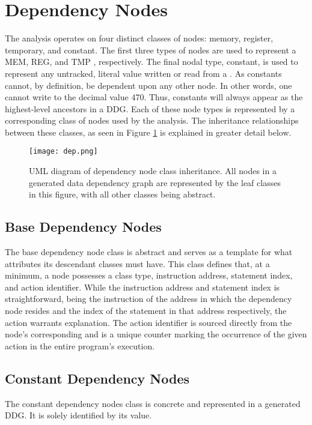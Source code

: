 \section{Dependency Nodes}
The analysis operates on four distinct classes of nodes: memory, register, temporary, and constant. The first three types of nodes are used to represent a MEM, REG, and TMP , respectively. The final nodal type, constant, is used to represent any untracked, literal value written or read from a . As constants cannot, by definition, be dependent upon any other node. In other words, one cannot write to the decimal value 470. Thus, constants will always appear as the highest-level ancestors in a DDG. Each of these node types is represented by a corresponding class of nodes used by the analysis. The inheritance relationships between these classes, as seen in Figure \ref{fig:dep} is explained in greater detail below.

\begin{figure}
    \centering
    \texttt{[image: dep.png]}
    \caption[UML Diagram of Dependency Node Class Inheritance]{UML diagram of dependency node class inheritance. All nodes in a generated data dependency graph are represented by the leaf classes in this figure, with all other classes being abstract.}
    \label{fig:dep}
\end{figure}


\subsection{Base Dependency Nodes}
The base dependency node class is abstract and serves as a template for what attributes its descendant classes must have. This class defines that, at a minimum, a node possesses a class type, instruction address, statement index, and action identifier. While the instruction address and statement index is straightforward, being the instruction of the address in which the dependency node resides and the index of the statement in that address respectively, the action warrants explanation. The action identifier is sourced directly from the node’s corresponding  and is a unique counter marking the occurrence of the given action in the entire program’s execution. 

\subsection{Constant Dependency Nodes}
The constant dependency nodes class is concrete and represented in a generated DDG. It is solely identified by its value.

